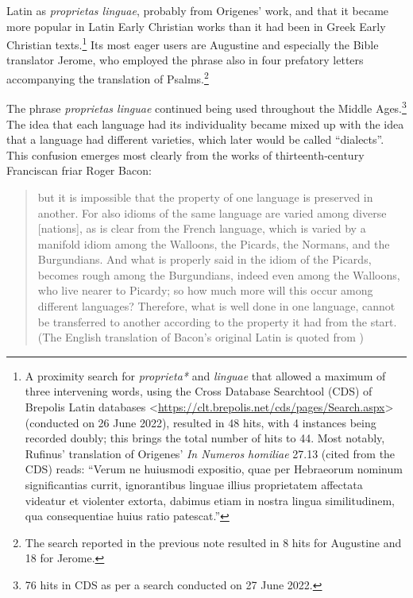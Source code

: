 Latin as \textit{proprietas linguae}, probably from Origenes’ work, and that it became more popular in Latin Early Christian works than it had been in Greek Early Christian texts.\footnote{A proximity search for \textit{proprieta*} and \textit{linguae} that allowed a maximum of three intervening words, using the Cross Database Searchtool (CDS) of Brepolis Latin databases <\url{https://clt.brepolis.net/cds/pages/Search.aspx}> (conducted on 26 June 2022), resulted in 48 hits, with 4 instances being recorded doubly; this brings the total number of hits to 44. Most notably, Rufinus’ translation of Origenes’ \textit{In Numeros homiliae} 27.13 (cited from the CDS) reads: “Verum ne huiusmodi expositio, quae per Hebraeorum nominum significantias currit, ignorantibus linguae illius proprietatem affectata videatur et violenter extorta, dabimus etiam in nostra lingua similitudinem, qua consequentiae huius ratio patescat.”} Its most eager users are Augustine and especially the Bible translator Jerome, who employed the phrase also in four prefatory letters accompanying the translation of Psalms.\footnote{The search reported in the previous note resulted in 8 hits for Augustine and 18 for Jerome.}

The phrase \textit{proprietas linguae} continued being used throughout the Middle Ages.\footnote{76 hits in CDS as per a search conducted on 27 June 2022.} The idea that each language had its individuality became mixed up with the idea that a language had different varieties, which later would be called “dialects”. This confusion emerges most clearly from the works of thirteenth‐cen\-tury Franciscan friar Roger Bacon:

\begin{quote}
    but it is impossible that the property of one language is preserved in another. For also idioms of the same language are varied among diverse [nations], as is clear from the French language, which is varied by a manifold idiom among the Walloons, the Picards, the Normans, and the Burgundians. And what is properly said in the idiom of the Picards, becomes rough among the Burgundians, indeed even among the Walloons, who live nearer to Picardy; so how much more will this occur among different languages? Therefore, what is well done in one language, cannot be transferred to another according to the property it had from the start. (The English translation of Bacon’s original Latin is quoted from \cite[35]{van_rooy_language_2020})
\end{quote}

